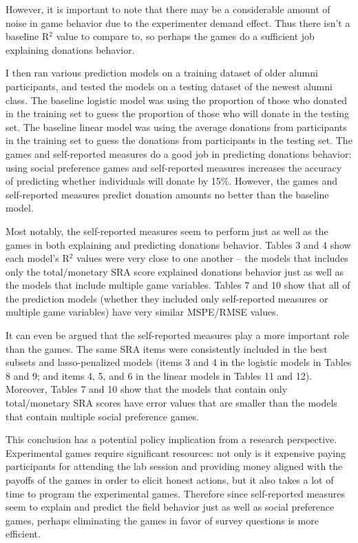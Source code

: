 \documentclass[12pt]{article}
\begin{document}
However, it is important to note that there may be a considerable amount of noise in game behavior due to the experimenter demand effect. Thus there isn\rq t a baseline R$^{2}$ value to compare to, so perhaps the games do a sufficient job explaining donations behavior.

I then ran various prediction models on a training dataset of older alumni participants, and tested the models on a testing dataset of the newest alumni class. The baseline logistic model was using the proportion of those who donated in the training set to guess the proportion of those who will donate in the testing set. The baseline linear model was using the average donations from participants in the training set to guess the donations from participants in the testing set. The games and self-reported measures do a good job in predicting donations behavior:  using social preference games and self-reported measures increases the accuracy of predicting whether individuals will donate by 15\%. However, the games and self-reported measures predict donation amounts no better than the baseline model.

Most notably, the self-reported measures seem to perform just as well as the games in both explaining and predicting donations behavior. Tables 3 and 4 show each model\rq s R$^{2}$ values were very close to one another -- the models that includes only the total/monetary SRA score explained donations behavior just as well as the models that include multiple game variables. Tables 7 and 10 show that all of the prediction models (whether they included only self-reported measures or multiple game variables) have very similar MSPE/RMSE values.

It can even be argued that the self-reported measures play a more important role than the games. The same SRA items were consistently included in the best subsets and lasso-penalized models (items 3 and 4 in the logistic models in Tables 8 and 9; and items 4, 5, and 6 in the linear models in Tables 11 and 12). Moreover, Tables 7 and 10 show that the models that contain only total/monetary SRA scores have error values that are smaller than the models that contain multiple social preference games.

This conclusion has a potential policy implication from a research perspective. Experimental games require significant resources: not only is it expensive paying participants for attending the lab session and providing money aligned with the payoffs of the games in order to elicit honest actions, but it also takes a lot of time to program the experimental games. Therefore since self-reported measures seem to explain and predict the field behavior just as well as social preference games, perhaps eliminating the games in favor of survey questions is more efficient.
\end{document}
